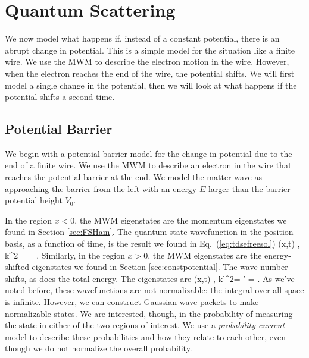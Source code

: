 \chapter{Quantum Scattering}
\label{ch:scattering}

We now model what happens if, instead of a constant potential, there is an abrupt change in potential. This is a simple model for the situation like a finite wire. We use the MWM to describe the electron motion in the wire. However, when the electron reaches the end of the wire, the potential shifts. We will first model a single change in the potential, then we will look at what happens if the potential shifts a second time.

\section{Potential Barrier}
We begin with a potential barrier model for the change in potential due to the end of a finite wire. We use the MWM to describe an electron in the wire that reaches the potential barrier at the end. We model the matter wave as approaching the barrier from the left with an energy $E$ larger than the barrier potential height $V_0$.%
\begin{marginfigure}
\centering
{}
\end{marginfigure}%
In the region $x<0$, the MWM eigenstates are the momentum eigenstates we found in Section \ref{sec:FSHam}. The quantum state wavefunction in the position basis, as a function of time, is the result we found in Eq.~(\ref{eq:tdsefreesol})
\beq
\Psi(x,t) \propto {},  k^2=  \omega = .
\eeq
Similarly, in the region $x>0$, the MWM eigenstates are the energy-shifted eigenstates we found in Section \ref{sec:constpotential}. The wave number shifts, as does the total energy. The eigenstates are 
\beq
\Psi(x,t) \propto {},  k'^2=  \omega' = .
\eeq{}
As we've noted before, these wavefunctions are not normalizable: the integral over all space is infinite. However, we can construct Gaussian wave packets to make normalizable states. We are interested, though, in the probability of measuring the state in either of the two regions of interest. We use a {\em probability current} model to describe these probabilities and how they relate to each other, even though we do not normalize the overall probability.


